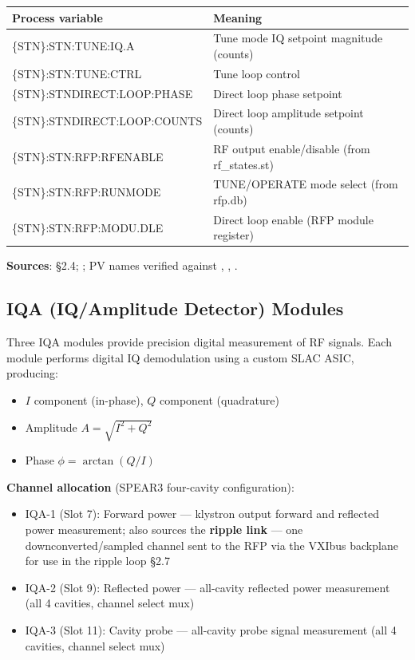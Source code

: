 \begin{center}\small
\begin{tabular}{@{}>{\ttfamily}l l@{}}
\toprule
\normalfont Process variable & Meaning \\
\midrule
\{STN\}:STN:TUNE:IQ.A & Tune mode IQ setpoint magnitude (counts) \\
\{STN\}:STN:TUNE:CTRL & Tune loop control \\
\{STN\}:STNDIRECT:LOOP:PHASE & Direct loop phase setpoint \\
\{STN\}:STNDIRECT:LOOP:COUNTS & Direct loop amplitude setpoint (counts) \\
\{STN\}:STN:RFP:RFENABLE & RF output enable/disable (from rf\_states.st) \\
\{STN\}:STN:RFP:RUNMODE & TUNE/OPERATE mode select (from rfp.db) \\
\{STN\}:STN:RFP:MODU.DLE & Direct loop enable (RFP module register) \\
\bottomrule
\end{tabular}
\end{center}

\begin{keynote}
\textbf{Sources}:  §2.4; ; PV names verified against , , .
\end{keynote}

\subsection{IQA (IQ/Amplitude Detector) Modules}

Three IQA modules provide precision digital measurement of RF signals. Each module performs digital IQ demodulation using a custom SLAC ASIC, producing:

\begin{itemize}
\tightlist
\item
  $I$ component (in-phase), $Q$ component (quadrature)
\item
  Amplitude $A = \sqrt{I^{2} + Q^{2}}$
\item
  Phase $\phi = \arctan(Q/I)$
\end{itemize}

\textbf{Channel allocation} (SPEAR3 four-cavity configuration):

\begin{itemize}
\tightlist
\item
  IQA-1 (Slot 7): Forward power --- klystron output forward and reflected power measurement; also sources the \textbf{ripple link} --- one downconverted/sampled channel sent to the RFP via the VXIbus backplane for use in the ripple loop  §2.7
\item
  IQA-2 (Slot 9): Reflected power --- all-cavity reflected power measurement (all 4 cavities, channel select mux)
\item
  IQA-3 (Slot 11): Cavity probe --- all-cavity probe signal measurement (all 4 cavities, channel select mux)
\end{itemize}

